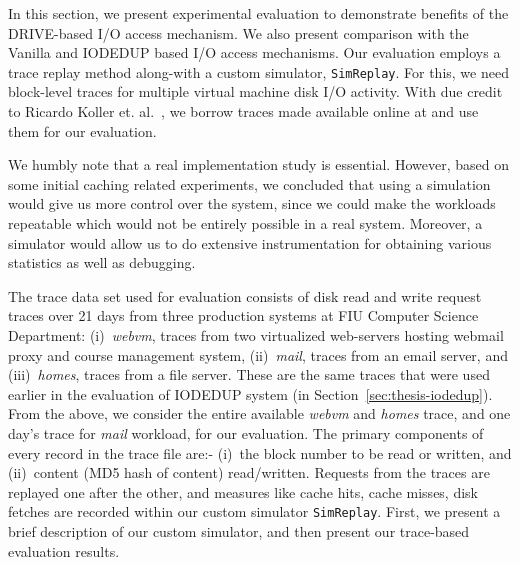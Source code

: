

In this section, we present experimental evaluation to demonstrate benefits
of the DRIVE-based I/O access mechanism. We also present comparison with
the Vanilla and IODEDUP based I/O access mechanisms. Our evaluation
employs a trace replay method along-with a custom simulator, \texttt{SimReplay}.
For this, we need block-level traces for multiple virtual 
machine disk I/O activity. With due credit to Ricardo Koller 
et. al.~\cite{iodedup, iodedup-online},
we borrow traces made available online at \cite{iodedup-online}
and use them for our evaluation. 

We humbly note that a real implementation study is essential. However, based 
on some initial caching related experiments, we concluded that using a 
simulation would give us more control over the system, since we could make 
the workloads repeatable which would not be entirely possible in a real 
system. Moreover, a simulator would allow us to do extensive instrumentation 
for obtaining various statistics as well as debugging.

The trace data set used for evaluation consists of
disk read and write request traces over 21 days from three production systems
at FIU Computer Science Department:
(i)~\textit{webvm}, traces from two virtualized web-servers hosting webmail
proxy and course management system, (ii)~\textit{mail}, traces from an
email server, and (iii)~\textit{homes}, traces from a file server.
These are the same traces that were
used earlier in the evaluation of IODEDUP system (in Section~\ref{sec:thesis-iodedup}).
From the above, we consider the entire available \textit{webvm}
and \textit{homes} trace, and one day's trace for \textit{mail} workload,
for our evaluation. 
The primary components of every record in the trace file are:-
(i)~the block number to be read or written, and 
(ii)~content (MD5 hash of content) read/written.
Requests from the traces are replayed one after the other, and 
measures like cache hits, cache misses, disk fetches are recorded within
our custom simulator \texttt{SimReplay}. 
First, we present a brief description of our custom simulator, 
and then present our trace-based evaluation results.

